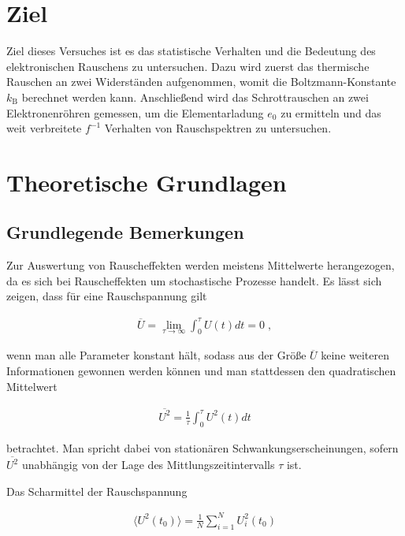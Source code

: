 \section{Ziel}
Ziel dieses Versuches ist es das statistische Verhalten und die Bedeutung des elektronischen Rauschens zu untersuchen. Dazu wird zuerst das thermische Rauschen an zwei Widerständen aufgenommen, womit die Boltzmann-Konstante $k_{\textrm{B}}$ berechnet werden kann. Anschließend wird das Schrottrauschen an zwei Elektronenröhren gemessen, um die Elementarladung $e_0$ zu ermitteln und das weit verbreitete $f^{-1}$ Verhalten von Rauschspektren zu untersuchen.

\section{Theoretische Grundlagen}
\subsection{Grundlegende Bemerkungen}
Zur Auswertung von Rauscheffekten werden meistens Mittelwerte herangezogen, da es sich bei Rauscheffekten um stochastische Prozesse handelt. Es lässt sich zeigen, dass für eine Rauschspannung gilt

\begin{align}
\overline{U} = \lim_{\tau \rightarrow \infty} \int_0^\tau U(t)dt = 0 \;,
\label{eqn:Rauschspannung}
\end{align}

wenn man alle Parameter konstant hält, sodass aus der Größe $\overline{U}$ keine weiteren Informationen gewonnen werden können und man stattdessen den quadratischen Mittelwert

\begin{align}
\overline{U^2} = \frac{1}{\tau} \int_0^\tau U^2(t)dt
\label{eqn:quadMittelwert}
\end{align}

betrachtet. Man spricht dabei von stationären Schwankungserscheinungen, sofern $\overline{U^2}$ unabhängig von der Lage des Mittlungszeitintervalls $\tau$ ist.

Das Scharmittel der Rauschspannung

\begin{align}
\langle U^2(t_0) \rangle = \frac{1}{N} \sum_{i=1}^{N} U_i^2(t_0)
\label{eqn:Scharmittel}
\end{align}

